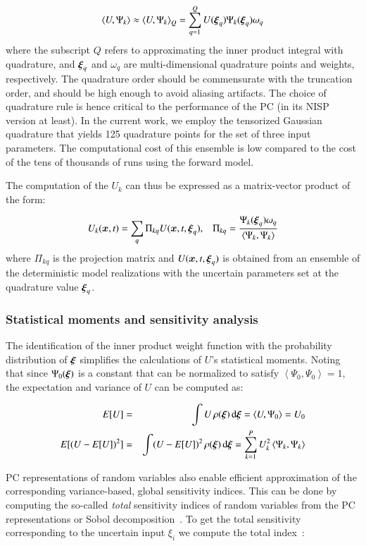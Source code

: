 \begin{equation}
  \left< U, \Psi_k \right> 
\approx \left< U, \Psi_k \right>_Q
= \sum_{q=1}^Q U(\xxi_q) \Psi_k(\xxi_q) \omega_q
\end{equation}
where the subscript $Q$ refers to approximating the inner product integral with
quadrature, and $\xxi_q$ and $\omega_q$ are multi-dimensional quadrature points and weights,
respectively. The quadrature order should be commensurate with the
truncation order, and should be high enough to avoid aliasing artifacts.
The choice of quadrature rule is hence critical to the performance
of the PC (in its NISP version at least). In the current work, we employ the 
tensorized Gaussian quadrature that yields 125 quadrature points for the set of three input parameters.
The computational cost of this ensemble is low compared to the cost of the 
tens of thousands of runs using the forward model.

The computation of the ${U}_k$ can thus be expressed as a matrix-vector product of the form:

\begin{equation} 
 U_k(\bm{x},t)=\sum_q \Pi_{kq} U(\bm{x},t,\xxi_q),\;\;\;
 \Pi_{kq}=\frac{\Psi_k(\xxi_q)\omega_q}{\left< \Psi_k, \Psi_k \right>}
\end{equation} 
where $\Pi_{kq}$ is the projection matrix and $U(\bm{x},t,\xxi_q)$ is obtained
from an ensemble of the deterministic model realizations with the uncertain parameters set at
the quadrature value $\xxi_q$. 


\subsubsection{Statistical moments and sensitivity analysis}
The identification of the inner product weight function
with the probability distribution of $\xxi$ simplifies the calculations of $U$'s statistical moments. 
Noting that since $\Psi_0(\xxi)$ is a constant that can be normalized to satisfy 
$\left<\Psi_0,\Psi_0\right>=1$, the expectation and variance of $U$ can be computed as:

\begin{eqnarray}
 E[U]&=&\int U \, \rho(\xxi) \, \mbox{d}\xxi=\left< U,\Psi_0\right> = U_0  
 \label{eq:mean} \\
 E[(U-E[U])^2]&=&\int (U-E[U])^2 \, \rho(\xxi) \, \mbox{d}\xxi=\sum_{k=1}^P U_k^2
 \label{eq:sigma}
\left<\Psi_k,\Psi_k\right>
\end{eqnarray}

PC representations of random variables also enable efficient
approximation of the corresponding variance-based, global
sensitivity indices. This can be done by computing the so-called {\it total} 
sensitivity indices of random variables from the PC representations or Sobol decomposition~\citep{Sobol:1993,Homma:1996,Sobol:2001}. To get the total sensitivity corresponding to the uncertain
input $\xi_i$ we compute the total index~\citep{LeMaitreKnio2010,Crestaux,Sudret}:

